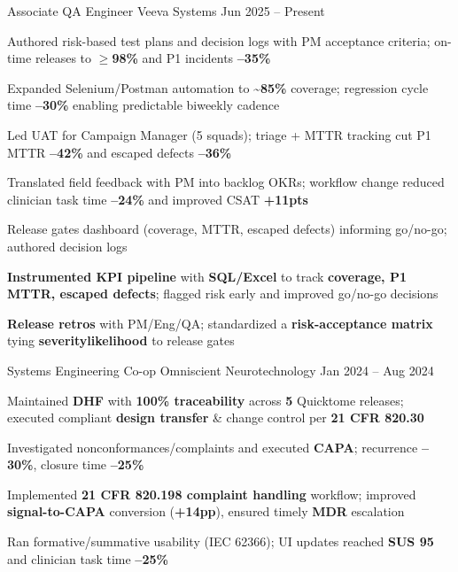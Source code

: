 \documentclass[11pt, a4paper]{russell}
\begin{document}
\begin{cventries}
\cventry
  {Associate QA Engineer} %
  {Veeva Systems} %
  {} %
  {Jun 2025 -- Present} %
  {
    \begin{cvitems}
        \item {Authored risk-based test plans and decision logs with PM acceptance criteria; on-time releases to \textbf{\ensuremath{\geq}98\%} and P1 incidents \textbf{--35\%}}
        \item {Expanded Selenium/Postman automation to \textbf{\textasciitilde85\%} coverage; regression cycle time \textbf{--30\%} enabling predictable biweekly cadence}
    \item {Led UAT for Campaign Manager (5 squads); triage + MTTR tracking cut P1 MTTR \textbf{--42\%} and escaped defects \textbf{--36\%}}
  \item {Translated field feedback with PM into backlog OKRs; workflow change reduced clinician task time \textbf{--24\%} and improved CSAT \textbf{+11pts}}
  \item {Release gates dashboard (coverage, MTTR, escaped defects) informing go/no-go; authored decision logs}
    \item {\textbf{Instrumented KPI pipeline} with \textbf{SQL/Excel} to track \textbf{coverage, P1 MTTR, escaped defects}; flagged risk early and improved go/no-go decisions}
    \item {\textbf{Release retros} with PM/Eng/QA; standardized a \textbf{risk-acceptance matrix} tying \textbf{severity\texttimes likelihood} to release gates}
    \end{cvitems}
  }
\cventry
  {Systems Engineering Co-op} %
  {Omniscient Neurotechnology} %
  {} %
  {Jan 2024 -- Aug 2024} %
  {
    \begin{cvitems}
  \item {Maintained \textbf{DHF} with \textbf{100\% traceability} across \textbf{5} Quicktome releases; executed compliant \textbf{design transfer} \& change control per \textbf{21 CFR 820.30}}
        \item {Investigated nonconformances/complaints and executed \textbf{CAPA}; recurrence \textbf{--30\%}, closure time \textbf{--25\%}}
  \item {Implemented \textbf{21 CFR 820.198 complaint handling} workflow; improved \textbf{signal-to-CAPA} conversion (\textbf{+14pp}), ensured timely \textbf{MDR} escalation}
        \item {Ran formative/summative usability (IEC 62366); UI updates reached \textbf{SUS 95} and clinician task time \textbf{--25\%}}

\end{cvitems}}
\end{cventries}
\end{document}
